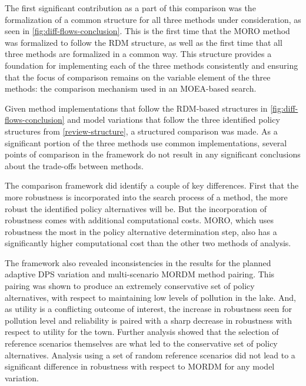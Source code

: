     The first significant contribution as a part of this comparison was the formalization of a common structure for all three methods under consideration, as seen in \cref{fig:diff-flows-conclusion}. This is the first time that the MORO method was formalized to follow the RDM structure, as well as the first time that all three methods are formalized in a common way. This structure provides a foundation for implementing each of the three methods consistently and ensuring that the focus of comparison remains on the variable element of the three methods: the comparison mechanism used in an MOEA-based search.  
    
    Given method implementations that follow the RDM-based structures in \cref{fig:diff-flows-conclusion} and model variations that follow the three identified policy structures from \cref{review-structure}, a structured comparison was made. As a significant portion of the three methods use common implementations, several points of comparison in the framework do not result in any significant conclusions about the trade-offs between methods. 
    
    The comparison framework did identify a couple of key differences. First that the more robustness is incorporated into the search process of a method, the more robust the identified policy alternatives will be. But the incorporation of robustness comes with additional computational costs. MORO, which uses robustness the most in the policy alternative determination step, also has a significantly higher computational cost than the other two methods of analysis. 
    
    The framework also revealed inconsistencies in the results for the planned adaptive DPS variation and multi-scenario MORDM method pairing. This pairing was shown to produce an extremely conservative set of policy alternatives, with respect to maintaining low levels of pollution in the lake. And, as utility is a conflicting outcome of interest, the increase in robustness seen for pollution level and reliability is paired with a sharp decrease in robustness with respect to utility for the town. Further analysis showed that the selection of reference scenarios themselves are what led to the conservative set of policy alternatives. Analysis using a set of random reference scenarios did not lead to a significant difference in robustness with respect to MORDM for any model variation. 
    

